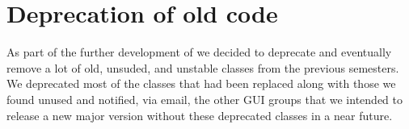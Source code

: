 
\section{Deprecation of old code}
\label{sec:deprecation_of_old_code}

As part of the further development of \gc we decided to deprecate and eventually remove a lot of old, unsuded, and unstable classes from the previous semesters. We deprecated most of the classes that had been replaced along with those we found unused and notified, via email, the other GUI groups that we intended to release a new major version without these deprecated classes in a near future.  
